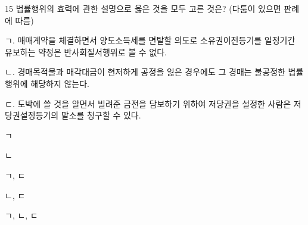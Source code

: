 \begin{question}{15}
법률행위의 효력에 관한 설명으로 옳은 것을 모두 고른 것은? (다툼이 있으면 판례에 따름)
\begin{framedtext}
ㄱ. 매매계약을 체결하면서 양도소득세를 면탈할 의도로 소유권이전등기를 일정기간 유보하는 약정은 반사회질서행위로 볼 수 없다. \par
ㄴ. 경매목적물과 매각대금이 현저하게 공정을 잃은 경우에도 그 경매는 불공정한 법률행위에 해당하지 않는다. \par
ㄷ. 도박에 쓸 것을 알면서 빌려준 금전을 담보하기 위하여 저당권을 설정한 사람은 저당권설정등기의 말소를 청구할 수 있다. \par
\end{framedtext}
\begin{choices}
  \item ㄱ
  \item ㄴ
  \item ㄱ, ㄷ
  \item ㄴ, ㄷ
  \item ㄱ, ㄴ, ㄷ
\end{choices}
\end{question}
